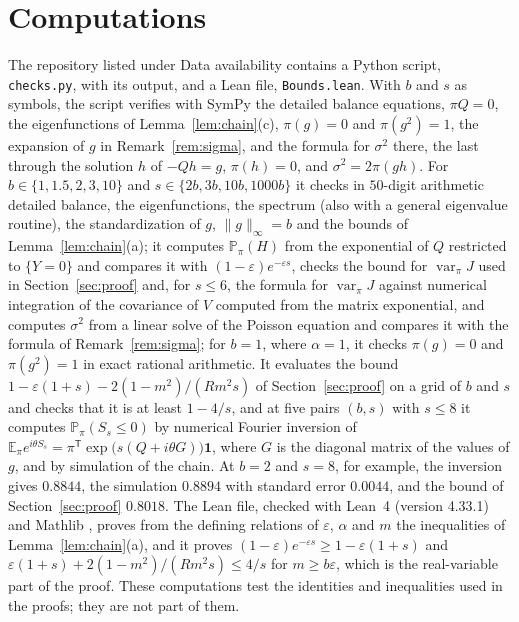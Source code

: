 \documentclass[11pt]{amsart}
\theoremstyle{remark}
\numberwithin{equation}{section}
\newcommand{\Pp}{\mathbb P}
\newcommand{\E}{\mathbb E}
\DeclareMathOperator{\var}{var}
\begin{document}
\section{Computations}\label{sec:checks}

The repository listed under Data availability contains a Python script, \texttt{checks.py}, with its output, and a Lean file, \texttt{Bounds.lean}. With $b$ and $s$ as symbols, the script verifies with SymPy the detailed balance equations, $\pi Q=0$, the eigenfunctions of Lemma~\ref{lem:chain}(c), $\pi(g)=0$ and $\pi(g^2)=1$, the expansion of $g$ in Remark~\ref{rem:sigma}, and the formula for $\sigma^2$ there, the last through the solution $h$ of $-Qh=g$, $\pi(h)=0$, and $\sigma^2=2\pi(gh)$. For $b\in\{1,1.5,2,3,10\}$ and $s\in\{2b,3b,10b,1000b\}$ it checks in $50$-digit arithmetic detailed balance, the eigenfunctions, the spectrum (also with a general eigenvalue routine), the standardization of $g$, $\|g\|_\infty=b$ and the bounds of Lemma~\ref{lem:chain}(a); it computes $\Pp_\pi(H)$ from the exponential of $Q$ restricted to $\{Y=0\}$ and compares it with $(1-\varepsilon)e^{-\varepsilon s}$, checks the bound for $\var_\pi J$ used in Section~\ref{sec:proof} and, for $s\le6$, the formula for $\var_\pi J$ against numerical integration of the covariance of $V$ computed from the matrix exponential, and computes $\sigma^2$ from a linear solve of the Poisson equation and compares it with the formula of Remark~\ref{rem:sigma}; for $b=1$, where $\alpha=1$, it checks $\pi(g)=0$ and $\pi(g^2)=1$ in exact rational arithmetic. It evaluates the bound $1-\varepsilon(1+s)-2(1-m^2)/(Rm^2s)$ of Section~\ref{sec:proof} on a grid of $b$ and $s$ and checks that it is at least $1-4/s$, and at five pairs $(b,s)$ with $s\le8$ it computes $\Pp_\pi(S_s\le0)$ by numerical Fourier inversion of $\E_\pi e^{i\theta S_s}=\pi^{\mathsf T}\exp\bigl(s(Q+i\theta G)\bigr)\mathbf 1$, where $G$ is the diagonal matrix of the values of $g$, and by simulation of the chain. At $b=2$ and $s=8$, for example, the inversion gives $0.8844$, the simulation $0.8894$ with standard error $0.0044$, and the bound of Section~\ref{sec:proof} $0.8018$. The Lean file, checked with Lean~4 \cite{MU21} (version 4.33.1) and Mathlib \cite{Mathlib20}, proves from the defining relations of $\varepsilon$, $\alpha$ and $m$ the inequalities of Lemma~\ref{lem:chain}(a), and it proves $(1-\varepsilon)e^{-\varepsilon s}\ge1-\varepsilon(1+s)$ and $\varepsilon(1+s)+2(1-m^2)/(Rm^2s)\le4/s$ for $m\ge b\varepsilon$, which is the real-variable part of the proof. These computations test the identities and inequalities used in the proofs; they are not part of them.
\end{document}
